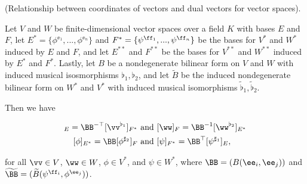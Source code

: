 \begin{theorem}
\label{ch::bilinear_forms_metric_tensors::thm::vectors_dual_vectors_metric_tensor}

    (Relationship between coordinates of vectors and dual vectors for vector spaces).
    
    Let $V$ and $W$ be finite-dimensional vector spaces over a field $K$ with bases $E$ and $F$, let $E^* = \{\phi^{\ee_1}, ..., \phi^{\ee_n}\}$ and $F^* = \{\psi^{\ff_1}, ..., \psi^{\ff_n}\}$ be the bases for $V^*$ and $W^*$ induced by $E$ and $F$, and let $E^{**}$ and $F^{**}$ be the bases for $V^{**}$ and $W^{**}$ induced by $E^*$ and $F^*$. Lastly, let $B$ be a nondegenerate bilinear form on $V$ and $W$ with induced musical isosmorphisms $\flat_1, \flat_2$, and let $\widetilde{B}$ be the induced nondegenerate bilinear form on $W^*$ and $V^*$ with induced musical isomorphisms $\widetilde{\flat}_1, \widetilde{\flat}_2$. 

    Then we have
    
    \begin{align*}
        [\vv]_E = \BB^{-\top} [\vv^{\flat_1}]_{F^*} &\text{ and }
        [\ww]_F = \BB^{-1} [\ww^{\flat_2}]_{E^*} \\
        [\phi]_{E^*} = \BB [\phi^{\sharp_2}]_F &\text{ and }
        [\psi]_{F^*} = \BB^\top [\psi^{\sharp_1}]_E,
    \end{align*}
    
    for all $\vv \in V$, $\ww \in W$, $\phi \in V^*$, and $\psi \in W^*$, where $\BB = (B(\ee_i, \ee_j))$ and $\widetilde{\BB} = (\widetilde{B}(\psi^{\ff_i}, \phi^{\ee_j}))$.
\end{theorem}

